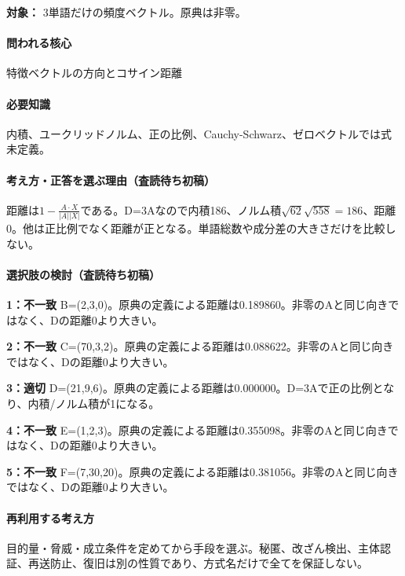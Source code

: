 \noindent\textbf{対象：} 3単語だけの頻度ベクトル。原典は非零。\par

\paragraph{問われる核心} 特徴ベクトルの方向とコサイン距離

\paragraph{必要知識} 内積、ユークリッドノルム、正の比例、Cauchy-Schwarz、ゼロベクトルでは式未定義。

\paragraph{考え方・正答を選ぶ理由（査読待ち初稿）} 距離は\(1-\frac{A\cdot X}{|A||X|}\)である。D=\allowbreak{}3Aなので内積186、ノルム積\(\sqrt{62}\sqrt{558}=186\)、距離0。他は正比例でなく距離が正となる。単語総数や成分差の大きさだけを比較しない。

\paragraph{選択肢の検討（査読待ち初稿）}\mbox{}\par

\noindent\textbf{1：不一致} B=\allowbreak{}(2,3,0)。原典の定義による距離は0.189860。非零のAと同じ向きではなく、Dの距離0より大きい。\par

\noindent\textbf{2：不一致} C=\allowbreak{}(70,3,2)。原典の定義による距離は0.088622。非零のAと同じ向きではなく、Dの距離0より大きい。\par

\noindent\textbf{3：適切} D=\allowbreak{}(21,9,6)。原典の定義による距離は0.000000。D=\allowbreak{}3Aで正の比例となり、内積/ノルム積が1になる。\par

\noindent\textbf{4：不一致} E=\allowbreak{}(1,2,3)。原典の定義による距離は0.355098。非零のAと同じ向きではなく、Dの距離0より大きい。\par

\noindent\textbf{5：不一致} F=\allowbreak{}(7,30,20)。原典の定義による距離は0.381056。非零のAと同じ向きではなく、Dの距離0より大きい。\par

\paragraph{再利用する考え方} 目的量・脅威・成立条件を定めてから手段を選ぶ。秘匿、改ざん検出、主体認証、再送防止、復旧は別の性質であり、方式名だけで全てを保証しない。

